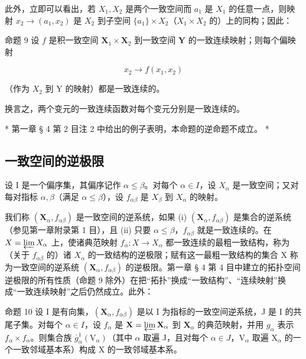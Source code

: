 此外，立即可以看出，若 \(X_{1}, X_{2}\) 是两个一致空间而 \(a_{1}\) 是 \(X_{1}\) 的任意一点，则映射 \(x_{2} \to (a_{1}, x_{2})\) 是 \(X_{2}\) 到子空间 \(\{a_{1}\} \times X_{2}\)（\(X_{1} \times X_{2}\) 的）上的同构；因此：

命题 9 设 \(f\) 是积一致空间 \(\mathbf{X}_1 \times \mathbf{X}_2\) 到一致空间 \(\mathbf{Y}\) 的一致连续映射；则每个偏映射

\[
x _ {2} \rightarrow f (x _ {1}, x _ {2})
\]

（作为 \(X_{2}\) 到 Y 的映射）都是一致连续的。

换言之，两个变元的一致连续函数对每个变元分别是一致连续的。

* 第一章 § 4 第 2 目注 2 中给出的例子表明，本命题的逆命题不成立。 *

\subsection{一致空间的逆极限}

设 I 是一个偏序集，其偏序记作 \(\alpha \leqslant \beta\)。对每个 \(\alpha \in I\)，设 \(X_{\alpha}\) 是一致空间；又对每对指标 \(\alpha, \beta\)（满足 \(\alpha \leqslant \beta\)），设 \(f_{\alpha \beta}\) 是 \(X_{\beta}\) 到 \(X_{\alpha}\) 的映射。

我们称 \((\mathbf{X}_{\alpha}, f_{\alpha\beta})\) 是一致空间的逆系统，如果 (i) \((\mathbf{X}_{\alpha}, f_{\alpha\beta})\) 是集合的逆系统（参见第一章附录第 1 目），且 (ii) 只要 \(\alpha \leqslant \beta\)，\(f_{\alpha\beta}\) 就是一致连续的。在 \(X = \varprojlim X_{\alpha}\) 上，使诸典范映射 \(f_{\alpha}: X \to X_{\alpha}\) 都一致连续的最粗一致结构，称为（关于 \(f_{\alpha\beta}\) 的）诸 \(X_{\alpha}\) 的一致结构的逆极限；赋有这一最粗一致结构的集合 X 称为一致空间的逆系统 \((\mathbf{X}_{\alpha}, f_{\alpha\beta})\) 的逆极限。第一章 § 4 第 4 目中建立的拓扑空间逆极限的所有性质（命题 9 除外）在把“拓扑”换成“一致结构”、“连续映射”换成“一致连续映射”之后仍然成立。此外：

命题 10 设 I 是有向集，\((\mathbf{X}_{\alpha}, f_{\alpha \beta})\) 是以 I 为指标的一致空间逆系统，J 是 I 的共尾子集。对每个 \(\alpha \in I\)，设 \(f_{\alpha}\) 是 \(\mathbf{X} = \varprojlim \mathbf{X}_{\alpha}\) 到 \(\mathbf{X}_{\alpha}\) 的典范映射，并用 \(g_{\alpha}\) 表示 \(f_{\alpha} \times f_{\alpha}\)。则集合族 \(\overline{g}_{\alpha}^{1}(\mathrm{V}_{\alpha})\)（其中 \(\alpha\) 取遍 J，且对每个 \(\alpha \in J\)，\(\mathrm{V}_{\alpha}\) 取遍 \(\mathrm{X}_{\alpha}\) 的一个一致邻域基本系）构成 X 的一致邻域基本系。


